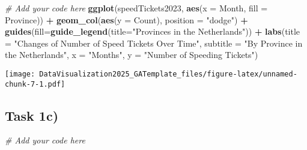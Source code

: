 \documentclass[
]{article}
\newenvironment{Shaded}{\begin{snugshade}}{\end{snugshade}}
\newcommand{\AttributeTok}[1]{\textcolor[rgb]{0.13,0.29,0.53}{#1}}
\newcommand{\CommentTok}[1]{\textcolor[rgb]{0.56,0.35,0.01}{\textit{#1}}}
\newcommand{\FunctionTok}[1]{\textcolor[rgb]{0.13,0.29,0.53}{\textbf{#1}}}
\newcommand{\NormalTok}[1]{#1}
\newcommand{\OtherTok}[1]{\textcolor[rgb]{0.56,0.35,0.01}{#1}}
\newcommand{\SpecialCharTok}[1]{\textcolor[rgb]{0.81,0.36,0.00}{\textbf{#1}}}
\newcommand{\StringTok}[1]{\textcolor[rgb]{0.31,0.60,0.02}{#1}}
\begin{document}
\begin{Shaded}
\begin{Highlighting}[]
\CommentTok{\# Add your code here}
\FunctionTok{ggplot}\NormalTok{(speedTickets2023, }\FunctionTok{aes}\NormalTok{(}\AttributeTok{x =}\NormalTok{ Month, }\AttributeTok{fill =}\NormalTok{ Province)) }\SpecialCharTok{+}
  \FunctionTok{geom\_col}\NormalTok{(}\FunctionTok{aes}\NormalTok{(}\AttributeTok{y =}\NormalTok{ Count), }\AttributeTok{position =} \StringTok{"dodge"}\NormalTok{) }\SpecialCharTok{+}
  \FunctionTok{guides}\NormalTok{(}\AttributeTok{fill=}\FunctionTok{guide\_legend}\NormalTok{(}\AttributeTok{title=}\StringTok{"Provinces in the Netherlands"}\NormalTok{)) }\SpecialCharTok{+}
  \FunctionTok{labs}\NormalTok{(}\AttributeTok{title =} \StringTok{"Changes of Number of Speed Tickets Over Time"}\NormalTok{,}
       \AttributeTok{subtitle =} \StringTok{"By Province in the Netherlands"}\NormalTok{,}
\AttributeTok{x =} \StringTok{"Months"}\NormalTok{, }\AttributeTok{y =} \StringTok{"Number of Speeding Tickets"}\NormalTok{)}
\end{Highlighting}
\end{Shaded}

\texttt{[image: DataVisualization2025\_GATemplate\_files/figure-latex/unnamed-chunk-7-1.pdf]}

\subsection{Task 1c)}\label{task-1c}

\begin{Shaded}
\end{Shaded}

\begin{Shaded}
\begin{Highlighting}[]
\CommentTok{\# Add your code here}
\end{Highlighting}
\end{Shaded}
\end{document}
